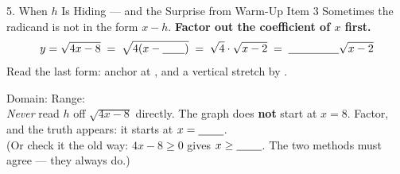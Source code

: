 \documentclass[10pt]{article}
\newcommand{\lgrid}[4]{%
  \draw[step=1, linegray!40, very thin] (#1,#3) grid (#2,#4);
  \draw[->, semithick, charcoal] (#1,0)--(#2,0) node[below right, font=\scriptsize]{$x$};
  \draw[->, semithick, charcoal] (0,#3)--(0,#4) node[left, font=\scriptsize]{$y$};}
\begin{document}
\begin{notesbox}{5. When $h$ Is Hiding --- and the Surprise from Warm-Up Item 3}
Sometimes the radicand is not in the form $x-h$. \textbf{Factor out the coefficient of $x$ first.}
\[
  y=\sqrt{4x-8} \;=\; \sqrt{4(x-\blank{0.7cm})} \;=\; \sqrt{4}\cdot\sqrt{x-2}
    \;=\; \blank{1.6cm}\sqrt{x-2}
\]
Read the last form: anchor at \blank{1.8cm}, and a vertical stretch by \blank{0.8cm}.
\begin{center}
\begin{minipage}[c]{0.46\linewidth}
\centering
{}
\end{minipage}
\begin{minipage}[c]{0.50\linewidth}
\small
Domain: \blank{2.2cm} \quad Range: \blank{2.2cm} \\[5pt]
\emph{Never} read $h$ off $\sqrt{4x-8}$ directly. The graph does \textbf{not} start at $x=8$.
Factor, and the truth appears: it starts at $x=\blank{0.8cm}$. \\[5pt]
(Or check it the old way: $4x-8\ge0$ gives $x\ge\blank{0.8cm}$. The two methods must agree ---
they always do.)
\end{minipage}
\end{center}


\end{notesbox}
\end{document}
